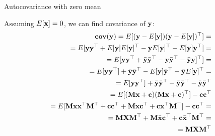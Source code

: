 \documentclass{beamer}
\begin{document}
\begin{frame}{Autocovariance with zero mean}
	\begin{flushleft}
		
		Assuming $E[\mathbf{x}] = 0$, we can find covariance of $\mathbf{y}$:
		\begin{align*}
			\textbf{cov}(\mathbf{y}) = E[(\mathbf{y} - E[\mathbf{y}])(\mathbf{y} - E[\mathbf{y}])^\top] =
			\\
			= E[\mathbf{y}\mathbf{y}^\top
			+ E[\mathbf{y}]E[\mathbf{y}]^\top
			- \mathbf{y}E[\mathbf{y}]^\top
			- E[\mathbf{y}]\mathbf{y}^\top] =
			\\
			=
			E[\mathbf{y}\mathbf{y}^\top
			+ \bar{\mathbf{y}}\bar{\mathbf{y}}^\top
			- \mathbf{y}\bar{\mathbf{y}}^\top
			- \bar{\mathbf{y}}\mathbf{y}]^\top]=
			\\
			=
			E[\mathbf{y}\mathbf{y}^\top]
			+ \bar{\mathbf{y}}\bar{\mathbf{y}}^\top
			- E[\mathbf{y}]\bar{\mathbf{y}}^\top
			- \bar{\mathbf{y}}E[\mathbf{y}]^\top=
			\\
			=
			E[\mathbf{y}\mathbf{y}^\top]
			+ \bar{\mathbf{y}}\bar{\mathbf{y}}^\top
			- \bar{\mathbf{y}}\bar{\mathbf{y}}^\top
			- \bar{\mathbf{y}}\bar{\mathbf{y}}^\top
			\\
			=
			E[(\mathbf{M}\mathbf{x} + \mathbf{c})(\mathbf{M}\mathbf{x} + \mathbf{c})^\top]
			- \mathbf{c}\mathbf{c}^\top
			\\
			=
			E[\mathbf{M}\mathbf{x}\mathbf{x}^\top \mathbf{M}^\top+
			\mathbf{c}\mathbf{c}^\top+
			\mathbf{M}\mathbf{x}\mathbf{c}^\top+
			\mathbf{c}\mathbf{x}^\top \mathbf{M}^\top]
			- \mathbf{c}\mathbf{c}^\top=
			\\
			=
			\mathbf{M}\mathbf{X} \mathbf{M}^\top+
			\mathbf{M}\bar{\mathbf{x}}\mathbf{c}^\top+
			\mathbf{c}\bar{\mathbf{x}}^\top \mathbf{M}^\top=
			\\
			=
			\mathbf{M}\mathbf{X} \mathbf{M}^\top
		\end{align*}
		
	\end{flushleft}
\end{frame}
\end{document}

